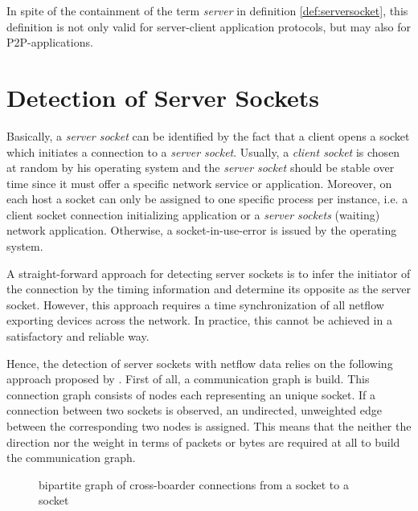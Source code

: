 In spite of the containment of the term \emph{server} in definition 
\ref{def:serversocket}, this definition is not only valid for server-client 
application protocols, but may also for P2P-applications. 

\section{Detection of Server Sockets\label{section:socket_detection}}

Basically, a \emph{server socket} can be identified by the fact that a client 
opens a socket which initiates a connection to a \emph{server socket}. Usually, 
a \emph{client socket} is chosen at random by his operating system and the 
\emph{server socket} should be stable over time since it must offer a specific 
network service or application. Moreover, on each host a socket can only be assigned to one specific process per instance, i.e. a client socket connection initializing application or a \emph{server sockets} (waiting) network application. Otherwise, a socket-in-use-error is issued by the operating system. 

A straight-forward approach for detecting server sockets is to infer the
initiator of the connection by the timing information and determine its opposite
as the server socket. However, this approach requires a time synchronization of
all netflow exporting devices across the network. In practice, this cannot be
achieved in a satisfactory and reliable way.

 Hence, the detection of server sockets with
netflow data relies on the following approach proposed by
\citet{Schatzmann:Mining,Schatzmann:Dissection, Schatzmann:Tracing}. First of
all, a communication graph is build. This connection graph consists of nodes
each representing an unique socket. If a connection between two sockets is
observed, an undirected, unweighted edge between the corresponding two nodes is
assigned. This means that the neither the direction nor the weight in terms of
packets or bytes are required at all to build the communication graph.

\begin{figure}
	[ht] \centering {}
	
	\caption{bipartite graph of cross-boarder connections from a socket to a
	socket} 
	\label{fig:bipartite_graph} 
\end{figure}

